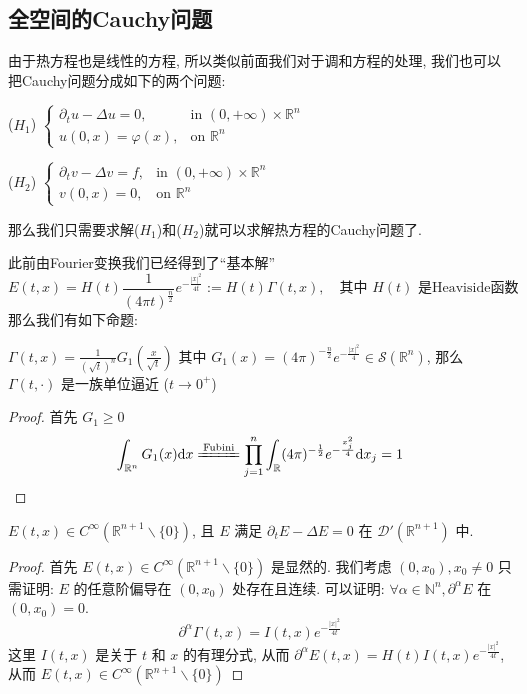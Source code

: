 \documentclass[11pt]{ctexart}[UTF8]
\begin{document}
\subsection{全空间的Cauchy问题}
由于热方程也是线性的方程, 所以类似前面我们对于调和方程的处理, 我们也可以把Cauchy问题分成如下的两个问题:\par
($H_{1}$) $\begin{cases}
    \partial_{t} u - \Delta u = 0, & \text{in } (0,+\infty)\times\mathbb{R}^n\\
    u(0,x) = \varphi(x), & \text{on }  \mathbb{R}^n 
    \end{cases}$\par
($H_{2}$) $\begin{cases}
    \partial_{t} v - \Delta v = f, & \text{in } (0,+\infty)\times\mathbb{R}^n\\
    v(0,x) = 0, & \text{on }  \mathbb{R}^n 
    \end{cases}$\par
那么我们只需要求解($H_{1}$)和($H_{2}$)就可以求解热方程的Cauchy问题了.\par
此前由Fourier变换我们已经得到了``基本解''
\begin{equation*}
    E(t,x) = H(t) \frac{1}{(4\pi t)^{\frac{n}{2}}} e^{-\frac{|x|^2}{4t}}:= H(t)\Gamma(t,x),\quad\text{其中 $H(t)$ 是Heaviside函数}
\end{equation*}
那么我们有如下命题:
\begin{proposition}
    $\Gamma(t,x) = \frac{1}{(\sqrt{t})^{n}}G_{1}(\frac{x}{\sqrt{t}})$ 其中 $G_{1}(x) = (4\pi)^{-\frac{n}{2}}e^{-\frac{|x|^2}{4}}\in \mathscr{S}(\mathbb{R}^n)$,
    那么 $\Gamma(t,\cdot)$ 是一族单位逼近 ($t \longrightarrow 0^+$)
\end{proposition}
\begin{proof}
    首先 $G_{1} \geq 0$
    \begin{equation*}
        \int_{\mathbb{R}^n} G_{1}(x) \mathrm{d}x \xlongequal{\text{Fubini}} \prod_{j=1}^{n}\int_{\mathbb{R}} (4\pi)^{-\frac{1}{2}} e^{-\frac{x_{j}^2}{4}} \mathrm{d}x_{j} = 1
    \end{equation*}
\end{proof}
\begin{proposition}
    $E(t,x) \in C^{\infty}(\mathbb{R}^{n+1}\backslash \{ 0 \})$, 且 $E$ 满足 $\partial_{t} E - \Delta E = 0$ 在 $\mathscr{D}'(\mathbb{R}^{n+1})$ 中.
\end{proposition}
\begin{proof}
    首先 $E(t,x) \in C^{\infty}(\mathbb{R}^{n+1}\backslash \{ 0 \})$ 是显然的. 我们考虑 $(0,x_{0}), x_{0} \neq 0$ 只需证明:
    $E$ 的任意阶偏导在 $(0,x_{0})$ 处存在且连续. 可以证明: $\forall \alpha \in \mathbb{N}^{n}, \partial^{\alpha} E$ 在 $(0,x_{0})=0$.
    \begin{equation*}
        \partial^{\alpha} \Gamma(t,x) = I(t,x) e^{-\frac{|x|^2}{4t}}
    \end{equation*}    
    这里 $I(t,x)$ 是关于 $t$ 和 $x$ 的有理分式, 从而 $\partial^{\alpha} E(t,x) = H(t) I(t,x) e^{-\frac{|x|^2}{4t}}$,
    从而 $E(t,x) \in C^{\infty}(\mathbb{R}^{n+1}\backslash \{ 0 \})$
\end{proof}
\end{document}
